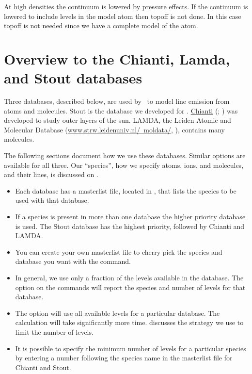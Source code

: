 At high densities the continuum is lowered by pressure effects.  If the continuum
is lowered to include levels in the model atom then topoff is not done.
In this case topoff is not needed since we have a complete model of the atom.

\section{Overview to the Chianti, Lamda, and Stout databases}

Three databases, described below, are used by \Cloudy\
to model line emission from atoms and molecules.
Stout is the database we developed for \Cloudy.
\href{http://www.chiantidatabase.org/}{Chianti}  
(\cite{Dere.K97CHIANTI---an-atomic-database-for-emission}; \cite{Landi2012})
was developed to study outer layers of the sun.
LAMDA, the Leiden Atomic and Molecular
Database (\href{http://www.strw.leidenuniv.nl/~moldata/}{www.strw.leidenuniv.nl/~moldata/}, 
\citet{Schoier.F05An-atomic-and-molecular-database-for-analysis}),
contains many molecules.

The following sections document how we use these databases.
Similar options are available for all three.
Our ``species'', how we specify atoms, ions, and molecules,
and their lines, is discussed on \pageref{sec:SpeciesDefine}.

\begin{itemize}
  
  \item Each database has a masterlist file, located in 
  , that lists the species
  to be used with that database.  

  \item If a species is
  present in more than one database the higher priority database is used.
  The Stout database has the highest priority, followed by Chianti and LAMDA.  
  
  \item You can create your own masterlist file
  to cherry pick the species and database you want with the
   command.
  
  \item In general, we use only a fraction of the levels available in the
  database.  The \cdCommand{print} option on the commands
  will report the species and number of levels for that database.
  
  \item The  option will use all available levels
  for a particular database.
  The calculation will take significantly more time.
  \citet{2013MNRAS.429.3133L} discusses
  the strategy we use to limit the number of levels.
  
  \item It is possible to specify the minimum number of levels 
  for a particular species by entering
  a number following the species name in the masterlist file for Chianti and Stout.
  
\end{itemize}

